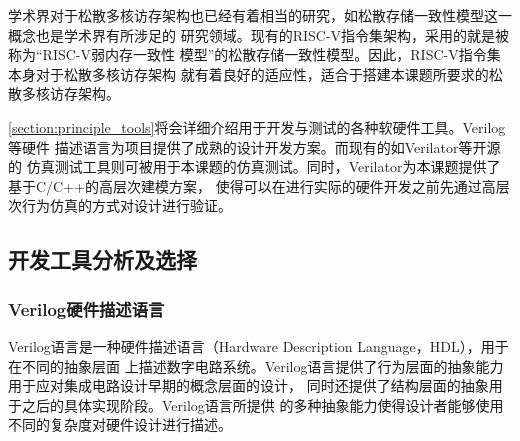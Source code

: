 学术界对于松散多核访存架构也已经有着相当的研究，如松散存储一致性模型这一概念也是学术界有所涉足的
研究领域\cite{adve1996shared}。现有的RISC-V指令集架构，采用的就是被称为“RISC-V弱内存一致性
模型”的松散存储一致性模型\cite{waterman2014risc}。因此，RISC-V指令集本身对于松散多核访存架构
就有着良好的适应性，适合于搭建本课题所要求的松散多核访存架构。

\autoref{section:principle_tools}将会详细介绍用于开发与测试的各种软硬件工具。Verilog等硬件
描述语言为项目提供了成熟的设计开发方案。\cite{thomas2008verilog}而现有的如Verilator等开源的
仿真测试工具则可被用于本课题的仿真测试。同时，Verilator为本课题提供了基于C/C++的高层次建模方案，
使得可以在进行实际的硬件开发之前先通过高层次行为仿真的方式对设计进行验证。

\subsection{开发工具分析及选择}
\label{section:principle_tools}

\subsubsection{Verilog硬件描述语言}


Verilog语言是一种硬件描述语言（Hardware Description Language，HDL），用于在不同的抽象层面
上描述数字电路系统。Verilog语言提供了行为层面的抽象能力用于应对集成电路设计早期的概念层面的设计，
同时还提供了结构层面的抽象用于之后的具体实现阶段\cite{thomas2008verilog}。Verilog语言所提供
的多种抽象能力使得设计者能够使用不同的复杂度对硬件设计进行描述。


